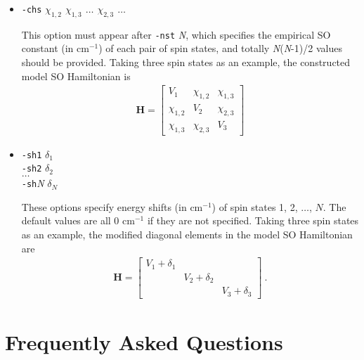 \documentclass[UTF8]{article}
\begin{document}
\begin{itemize}[leftmargin= 0 pt]
\item \verb|-chs| \textit{$\chi_{1,2}$ $\chi_{1,3}$ $\ldots$ $\chi_{2,3}$ $\ldots$}

This option must appear after \verb|-nst| \textit{N}, which specifies the empirical SO constant (in cm$^{-1}$) of each pair of spin states, and totally \textit{N}(\textit{N}-1)/2
values should be provided.
Taking three spin states as an example, the constructed model SO Hamiltonian is
\begin{align}\label{hso0-eq2}
\mathbf{H} = \left[\begin{array}{ccc}
    V_1 & \chi_{1,2} & \chi_{1,3} \\
    \chi_{1,2} & V_2 & \chi_{2,3} \\
    \chi_{1,3} & \chi_{2,3} & V_3
\end{array}\right]
\end{align}

\item \verb|-sh1| \textit{$\delta_1$} \\
 \verb|-sh2| \textit{$\delta_2$} \\
 $\ldots$ \\
 \verb|-sh|\textit{N} \textit{$\delta_N$}

These options specify energy shifts (in cm$^{-1}$) of spin states 1, 2, $\ldots$, $N$.
The default values are all 0 cm$^{-1}$ if they are not specified.
Taking three spin states as an example, the modified diagonal elements in the model SO Hamiltonian are
\begin{align}\label{hso0-eq2}
\mathbf{H} = \left[\begin{array}{ccc}
    V_1 + \delta_1 & {} & {} \\
    {} & V_2 + \delta_2 & {} \\
    {} & {} & V_3 + \delta_3
\end{array}\right] \> .
\end{align}

\end{itemize}


\section{Frequently Asked Questions}
\end{document}
